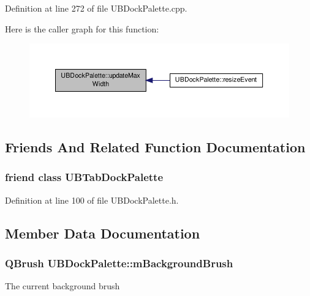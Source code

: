 Definition at line 272 of file U\-B\-Dock\-Palette.\-cpp.



Here is the caller graph for this function\-:
\nopagebreak
\begin{figure}[H]
\begin{center}
\leavevmode
\includegraphics[width=350pt]{dc/d54/class_u_b_dock_palette_aaa2875f5907c022762b4cde1ee69e961_icgraph}
\end{center}
\end{figure}




\subsection{Friends And Related Function Documentation}
\hypertarget{class_u_b_dock_palette_a087cc121fd30b34b5df5556e9391ffbf}{
\subsubsection[{U\-B\-Tab\-Dock\-Palette}]{\setlength{\rightskip}{0pt plus 5cm}friend class {\bf U\-B\-Tab\-Dock\-Palette}\hspace{0.3cm}{\ttfamily [friend]}}}\label{dc/d54/class_u_b_dock_palette_a087cc121fd30b34b5df5556e9391ffbf}


Definition at line 100 of file U\-B\-Dock\-Palette.\-h.



\subsection{Member Data Documentation}
\hypertarget{class_u_b_dock_palette_a75d5806767dde185d5c4231f3c313088}{
\subsubsection[{m\-Background\-Brush}]{\setlength{\rightskip}{0pt plus 5cm}Q\-Brush U\-B\-Dock\-Palette\-::m\-Background\-Brush\hspace{0.3cm}{\ttfamily [protected]}}}\label{dc/d54/class_u_b_dock_palette_a75d5806767dde185d5c4231f3c313088}
The current background brush 

